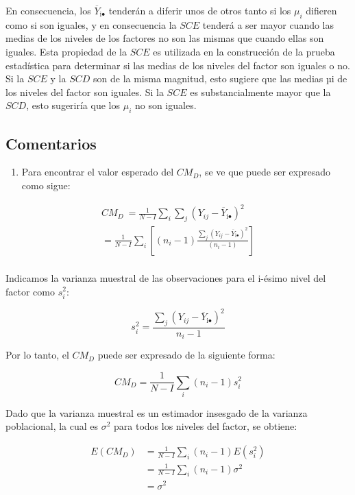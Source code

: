 \documentclass[]{book}
\providecommand{\tightlist}{%
  \setlength{\itemsep}{0pt}\setlength{\parskip}{0pt}}
\theoremstyle{definition}
\theoremstyle{definition}
\theoremstyle{definition}
\theoremstyle{remark}
\begin{document}
En consecuencia, los \({\overline{Y}}_{\text{i}\bullet}\) tenderán a
diferir unos de otros tanto si los \(\mu_i\) difieren como si son
iguales, y en consecuencia la \(SCE\) tenderá a ser mayor cuando las
medias de los niveles de los factores no son las mismas que cuando ellas
son iguales. Esta propiedad de la \(SCE\) es utilizada en la
construcción de la prueba estadística para determinar si las medias de
los niveles del factor son iguales o no. Si la \(SCE\) y la \(SCD\) son
de la misma magnitud, esto sugiere que las medias µi de los niveles del
factor son iguales. Si la \(SCE\) es substancialmente mayor que la
\(SCD\), esto sugeriría que los \(\mu_i\) no son iguales.

\hypertarget{comentarios-1}{%
\subsection{Comentarios}\label{comentarios-1}}

\begin{enumerate}
\def\labelenumi{\arabic{enumi}.}
\tightlist
\item
  Para encontrar el valor esperado del \(CM_D\), se ve que puede ser
  expresado como sigue:
\end{enumerate}

\[
\begin{matrix}
CM_D\  = \frac{1}{N - I}\sum_{i}^{}{\sum_{j}^{}\left( Y_{ij} - {\overline{Y}}_{\text{i}\bullet} \right)^{2}} \\
 = \frac{1}{N - I}\sum_{i}^{}\left\lbrack \left( n_{i} - 1 \right)\frac{\sum_{j}^{}\left( Y_{ij} - {\overline{Y}}_{\text{i}\bullet} \right)^{2}}{\left( n_{i} - 1 \right)} \right\rbrack \\
\end{matrix}
\]

Indicamos la varianza muestral de las observaciones para el i-ésimo
nivel del factor como \(s_{i}^{2}\):

\[
s_{i}^{2} = \frac{\sum_{j}^{}\left( Y_{ij} - {\overline{Y}}_{\text{i}\bullet} \right)^{2}}{n_{i} - 1}
\]

Por lo tanto, el \(CM_D\) puede ser expresado de la siguiente forma:

\[
CM_D = \frac{1}{N - I}\sum_{i}^{}{\left( n_{i} - 1 \right)s_{i}^{2}}
\]

Dado que la varianza muestral es un estimador insesgado de la varianza
poblacional, la cual es \(\sigma^{2}\) para todos los niveles del
factor, se obtiene:

\[
\begin{aligned}
E\left( CM_D \right)& = \frac{1}{N - I}\sum_{i}^{}{\left( n_{i} - 1 \right)E\left( s_{i}^{2} \right)} \\
& = \frac{1}{N - I}\sum_{i}^{}{\left( n_{i} - 1 \right)\sigma^{2}} \\
& = \sigma^{2} \\
\end{aligned}
\]
\end{document}
